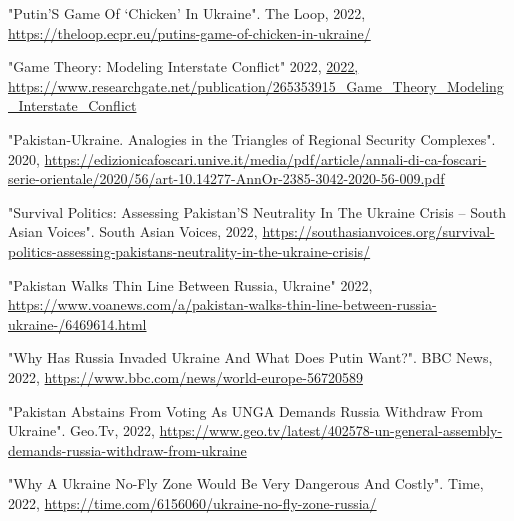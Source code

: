 \documentclass[runningheads]{llncs}
\begin{document}
\newpage
\begin{thebibliography}{8}
"Putin’S Game Of ‘Chicken’ In Ukraine". The Loop, 2022, \href{https://theloop.ecpr.eu/putins-game-of-chicken-in-ukraine/}{https://theloop.ecpr.eu/putins-game-of-chicken-in-ukraine/}

"Game Theory: Modeling Interstate Conflict" 2022, \href{https://www.researchgate.net/publication/265353915_Game_Theory_Modeling_Interstate_Conflict}{2022, https://www.researchgate.net/publication/265353915_Game_Theory_Modeling_Interstate_Conflict}

"Pakistan-Ukraine. Analogies in the Triangles of Regional Security Complexes". 2020, \href{https://edizionicafoscari.unive.it/media/pdf/article/annali-di-ca-foscari-serie-orientale/2020/56/art-10.14277-AnnOr-2385-3042-2020-56-009.pdf}{https://edizionicafoscari.unive.it/media/pdf/article/annali-di-ca-foscari-serie-orientale/2020/56/art-10.14277-AnnOr-2385-3042-2020-56-009.pdf}

"Survival Politics: Assessing Pakistan’S Neutrality In The Ukraine Crisis – South Asian Voices". South Asian Voices, 2022, \href{https://southasianvoices.org/survival-politics-assessing-pakistans-neutrality-in-the-ukraine-crisis/}{https://southasianvoices.org/survival-politics-assessing-pakistans-neutrality-in-the-ukraine-crisis/}

"Pakistan Walks Thin Line Between Russia, Ukraine" 2022, \href{https://www.voanews.com/a/pakistan-walks-thin-line-between-russia-ukraine-/6469614.html}{https://www.voanews.com/a/pakistan-walks-thin-line-between-russia-ukraine-/6469614.html}

"Why Has Russia Invaded Ukraine And What Does Putin Want?". BBC News, 2022, \href{https://www.bbc.com/news/world-europe-56720589}{https://www.bbc.com/news/world-europe-56720589}

"Pakistan Abstains From Voting As UNGA Demands Russia Withdraw From Ukraine". Geo.Tv, 2022, \href{https://www.geo.tv/latest/402578-un-general-assembly-demands-russia-withdraw-from-ukraine}{https://www.geo.tv/latest/402578-un-general-assembly-demands-russia-withdraw-from-ukraine}

"Why A Ukraine No-Fly Zone Would Be Very Dangerous And Costly". Time, 2022, \href{https://time.com/6156060/ukraine-no-fly-zone-russia/}{https://time.com/6156060/ukraine-no-fly-zone-russia/}


\end{thebibliography}
\end{document}
